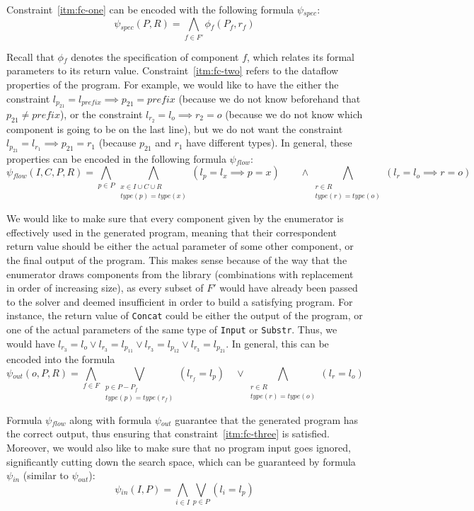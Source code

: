 Constraint~\ref{itm:fc-one} can be encoded with the following formula $\psi{}_{spec}$:
%
\[
  \psi{}_{spec}(P, R) = \bigwedge_{f \in F'} \phi{}_f (P_f, r_f)
\]

\noindent
Recall that $\phi{}_f$ denotes the specification of component $f$, which relates
its formal parameters to its return value.
Constraint~\ref{itm:fc-two} refers to
the dataflow properties of the program. For example, we would like to have the
either the constraint $l_{p_{21}} = l_{prefix} \implies p_{21} = prefix$
(because we do not know beforehand that $p_{21} \neq prefix$),
or the constraint $l_{r_2} = l_o \implies r_2 = o$
(because we do not know which component is going to be on the last line),
but we do not want the constraint $l_{p_{21}} = l_{r_1} \implies p_{21} = r_1$
(because $p_{21}$ and $r_1$ have different types).
In general, these properties can be encoded in the following formula $\psi{}_{flow}$:
%
\[
  \psi{}_{flow}(I, C, P, R) =
    \bigwedge_{p \in P}
    \bigwedge_{\substack{x \in I \cup C \cup R \\ type(p) = type(x)}} 
    (l_p = l_x \implies p = x)
    \qquad \wedge \bigwedge_{\substack{r \in R \\ type(r) = type(o)}}
    (l_r = l_o \implies r = o)
\]

\noindent
We would like to make sure that every component given by the enumerator is
effectively used in the generated program, meaning that their correspondent
return value should be either the actual parameter of some other component, or
the final output of the program. This makes sense because of the way that the
enumerator draws components from the library (combinations with replacement in
order of increasing size), as every subset of $F'$ would have already been
passed to the solver and deemed insufficient in order to build a satisfying
program. For instance, the return value of \lstinline{Concat} could be either
the output of the program, or one of the actual parameters of the same type of
\lstinline{Input} or \lstinline{Substr}. Thus, we would have
$l_{r_3} = l_o \vee l_{r_3} = l_{p_{11}} \vee l_{r_3} = l_{p_{12}} \vee l_{r_3} = l_{p_{21}}$.
In general, this can be encoded into the formula
%
\[
  \psi{}_{out}(o, P, R) =
  \bigwedge_{f \in F}
  \bigvee_{\substack{p \in P - P_f \\ type(p) = type(r_f)}}(l_{r_f} = l_p)
  \quad \vee \bigwedge_{\substack{r \in R \\ type(r) = type(o)}} (l_{r} = l_o)
\]

\noindent
Formula $\psi{}_{flow}$ along with formula $\psi{}_{out}$ guarantee that the generated
program has the correct output, thus ensuring that constraint~\ref{itm:fc-three}
is satisfied. Moreover, we would also like to make sure that no program input
goes ignored, significantly cutting down the search space, which can be
guaranteed by formula $\psi{}_{in}$ (similar to $\psi{}_{out}$):
%
\[
  \psi{}_{in}(I, P) = \bigwedge_{i \in I}\bigvee_{p \in P}(l_i = l_p)
\]

